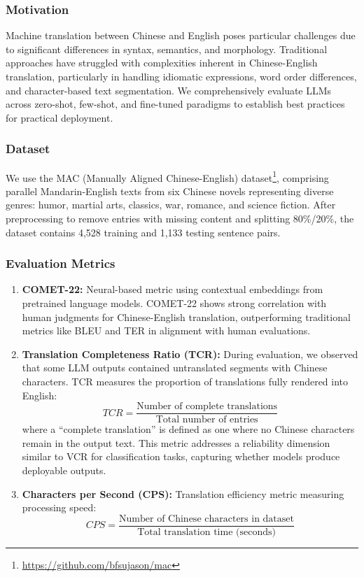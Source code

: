\subsubsection{Motivation}

Machine translation between Chinese and English poses particular challenges due to significant differences in syntax, semantics, and morphology. Traditional approaches have struggled with complexities inherent in Chinese-English translation, particularly in handling idiomatic expressions, word order differences, and character-based text segmentation. We comprehensively evaluate LLMs across zero-shot, few-shot, and fine-tuned paradigms to establish best practices for practical deployment.

\subsubsection{Dataset}

We use the MAC (Manually Aligned Chinese-English) dataset\footnote{\url{https://github.com/bfsujason/mac}}, comprising parallel Mandarin-English texts from six Chinese novels representing diverse genres: humor, martial arts, classics, war, romance, and science fiction. After preprocessing to remove entries with missing content and splitting 80\%/20\%, the dataset contains 4,528 training and 1,133 testing sentence pairs.

\subsubsection{Evaluation Metrics}

\begin{enumerate}[leftmargin=*]
    \item \textbf{COMET-22:} Neural-based metric using contextual embeddings from pretrained language models. COMET-22 shows strong correlation with human judgments for Chinese-English translation, outperforming traditional metrics like BLEU and TER in alignment with human evaluations.
    
    \item \textbf{Translation Completeness Ratio (TCR):} During evaluation, we observed that some LLM outputs contained untranslated segments with Chinese characters. TCR measures the proportion of translations fully rendered into English:
    \begin{equation}
    TCR = \frac{\text{Number of complete translations}}{\text{Total number of entries}}
    \end{equation}
    where a ``complete translation'' is defined as one where no Chinese characters remain in the output text. This metric addresses a reliability dimension similar to VCR for classification tasks, capturing whether models produce deployable outputs.
    
    \item \textbf{Characters per Second (CPS):} Translation efficiency metric measuring processing speed:
    \begin{equation}
    CPS = \frac{\text{Number of Chinese characters in dataset}}{\text{Total translation time (seconds)}}
    \end{equation}
\end{enumerate}

